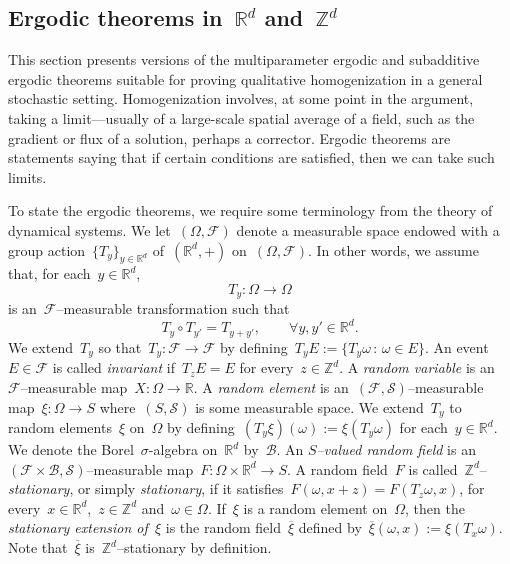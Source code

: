 \documentclass[11pt,twoside]{article} %
\numberwithin{equation}{section}
\theoremstyle{definition}
\newcommand*{\R}{\ensuremath{\mathbb{R}}}
\newcommand*{\Zd}{\ensuremath{\mathbb{Z}^d}}
\newcommand*{\Rd}{\ensuremath{\mathbb{R}^d}}
\newcommand{\F}{\mathcal{F}}
\begin{document}
\subsection{Ergodic theorems in~\texorpdfstring{$\Rd$}{{Rd}} and~\texorpdfstring{$\Zd$}{{Zd}}}
\label{ss.ergodic}

This section presents versions of the multiparameter ergodic and subadditive ergodic theorems suitable for proving qualitative homogenization in a general stochastic setting. Homogenization involves, at some point in the argument, taking a limit---usually of a large-scale spatial average of a field, such as the gradient or flux of a solution, perhaps a corrector. 
Ergodic theorems are statements saying that if certain conditions are satisfied, then we can take such limits. 


\smallskip

To state the ergodic theorems, we require some terminology from the theory of dynamical systems. We let~$(\Omega,\F)$ denote a measurable space endowed with a group action~$\{T_y\}_{y\in\Rd}$ of~$(\Rd,+)$ on~$(\Omega,\F)$. In other words, we assume that, for each~$y\in\Rd$,
\begin{equation}
T_y:\Omega \to \Omega
\end{equation}
is an~$\F$--measurable transformation such that
\begin{equation}
T_y \circ T_{y'} = T_{y+y'}, \qquad \forall y,y'\in\Rd.
\end{equation}
We extend~$T_y$ so that~$T_y :\F \to \F$ by defining~$T_yE := \{ T_y \omega \,:\, \omega \in E \}$. 
An event~$E \in \F$ is called \emph{invariant} if~$T_z E = E$ for every~$z\in\Zd$. 
A \emph{random variable} is an~$\F$--measurable map~$X:\Omega \to \R$. A \emph{random element} is an~$(\F,\mathcal{S})$--measurable map~$\xi : \Omega \to S$ where~$(S,\mathcal{S})$ is some measurable space. 
We extend~$T_y$ to random elements~$\xi$ on~$\Omega$ by defining~$(T_y\xi)(\omega) := \xi(T_y\omega)$ for each~$y\in\Rd$. 
We denote the Borel~$\sigma$-algebra on~$\Rd$ by~$\mathscr{B}$. An \emph{$S$--valued random field} is an~$(\F \times \mathscr{B} , \mathcal{S})$--measurable map~$F: \Omega \times \Rd \to S$. A random field~$F$ is called~$\Zd$--\emph{stationary}, or simply \emph{stationary}, if it satisfies~$F(\omega,x+z) = F(T_z\omega,x)$, for every~$x\in\Rd$,~$z\in \Zd$ and~$\omega\in\Omega$. 
If~$\xi$ is a random element on~$\Omega$, then the \emph{stationary extension of~$\xi$} is the random field~$\overline{\xi}$ defined by~$\overline{\xi}(\omega,x) := \xi(T_x\omega)$. Note that~$\overline{\xi}$ is~$\Zd$--stationary by definition. 
\end{document}

